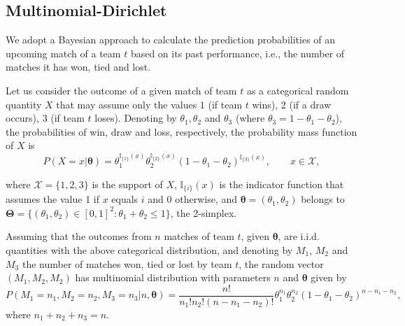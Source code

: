\documentclass[journal,article,accept,moreauthors,pdftex,12pt,a4paper]{mdpi}
\begin{document}
	\subsection{Multinomial-Dirichlet}
	\label{sec::Mn_Dir}
	
		We adopt a Bayesian approach to calculate the prediction probabilities of an upcoming match of a team $t$ based on its past performance, i.e., the number of matches it has won, tied and lost.
		
		Let us consider the outcome of a given match of team $t$ as a categorical random quantity $X$ that may assume only the values $1$ (if team $t$ wins), $2$ (if a draw occurs), $3$ (if team $t$ loses).
		Denoting by $\theta_1, \theta_2$ and $\theta_3$ (where $\theta_3 = 1-\theta_1 - \theta_2$), the probabilities of win, draw and loss, respectively, the probability mass function of $X$ is
		\[
		P(X=x | \boldsymbol{\theta}) = \theta_1^{\mathbb{I}_{\{1\}}(x)}
		\theta_2^{\mathbb{I}_{\{2\}}(x)}(1 - \theta_1 -
		\theta_2)^{{\mathbb{I}_{\{3\}}}(x)}, \qquad x \in \mathcal{X},
		\]
		
		\noindent
		where $\mathcal{X}=\{1,2,3\}$ is the support of $X$,
		$\mathbb{I}_{\{i\}}(x)$ is the indicator function that assumes the
		value 1 if $x$ equals $i$ and 0 otherwise, and $\boldsymbol{\theta}
		= (\theta_1, \theta_2)$ belongs to $\boldsymbol{\Theta} =
		\{(\theta_1,\theta_2)\in [0,1]^2: \theta_1+\theta_2 \leq 1 \}$, the 2-simplex.
		
		Assuming that the outcomes from $n$ matches of team $t$, given $\boldsymbol{\theta}$, are i.i.d. quantities with the above categorical distribution, and denoting by $M_1$, $M_2$ and $M_3$ the number of matches won, tied or lost by team $t$, the random vector $(M_1, M_2, M_2)$ has multinomial distribution with parameters $n$ and $\boldsymbol{\theta}$ given by
		\[
		P(M_1=n_1,M_2=n_2,M_3=n_3| n, \boldsymbol{\theta})=
		\frac{n!}{n_1!n_2!(n-n_1-n_2)!}\theta_1^{n_1}\theta_2^{n_2}(1-\theta_1-\theta_2)^{n-n_1-n_2},
		\]
		\noindent 
		where $n_1 + n_2 + n_3 = n$.
		
\end{document}
